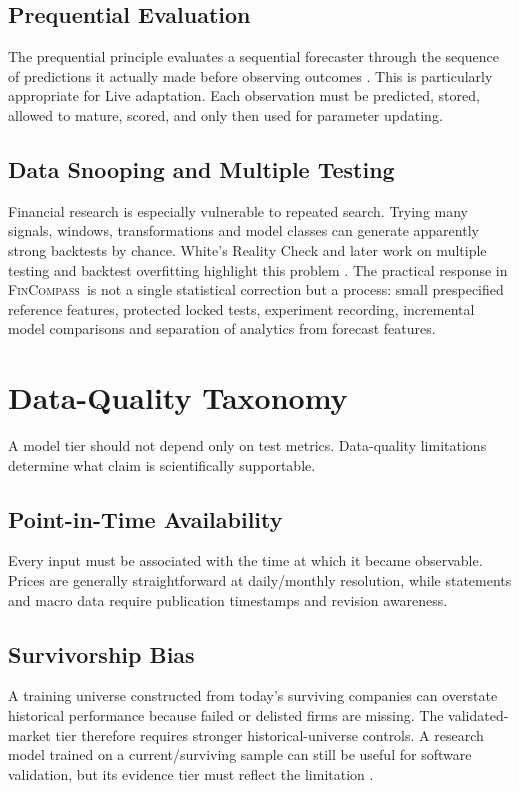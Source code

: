 \documentclass[11pt]{article}
\newcommand{\FC}{\textsc{FinCompass}}
\begin{document}
\subsection{Prequential Evaluation}
The prequential principle evaluates a sequential forecaster through the sequence of predictions it actually made before observing outcomes \citep{dawid1984prequential}. This is particularly appropriate for Live adaptation. Each observation must be predicted, stored, allowed to mature, scored, and only then used for parameter updating.

\subsection{Data Snooping and Multiple Testing}
Financial research is especially vulnerable to repeated search. Trying many signals, windows, transformations and model classes can generate apparently strong backtests by chance. White's Reality Check and later work on multiple testing and backtest overfitting highlight this problem \citep{white2000reality,harvey2016crosssection,bailey2017pbo}. The practical response in \FC\ is not a single statistical correction but a process: small prespecified reference features, protected locked tests, experiment recording, incremental model comparisons and separation of analytics from forecast features.

\section{Data-Quality Taxonomy}
A model tier should not depend only on test metrics. Data-quality limitations determine what claim is scientifically supportable.

\subsection{Point-in-Time Availability}
Every input must be associated with the time at which it became observable. Prices are generally straightforward at daily/monthly resolution, while statements and macro data require publication timestamps and revision awareness.

\subsection{Survivorship Bias}
A training universe constructed from today's surviving companies can overstate historical performance because failed or delisted firms are missing. The validated-market tier therefore requires stronger historical-universe controls. A research model trained on a current/surviving sample can still be useful for software validation, but its evidence tier must reflect the limitation \citep{shumway1997delisting}.
\end{document}
